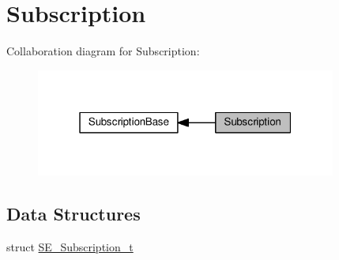 \hypertarget{group__Subscription}{}\section{Subscription}
\label{group__Subscription}
Collaboration diagram for Subscription\+:\nopagebreak
\begin{figure}[H]
\begin{center}
\leavevmode
\includegraphics[width=280pt]{group__Subscription}
\end{center}
\end{figure}
\subsection*{Data Structures}
\begin{DoxyCompactItemize}
\item 
struct \hyperlink{structSE__Subscription__t}{S\+E\+\_\+\+Subscription\+\_\+t}
\end{DoxyCompactItemize}
